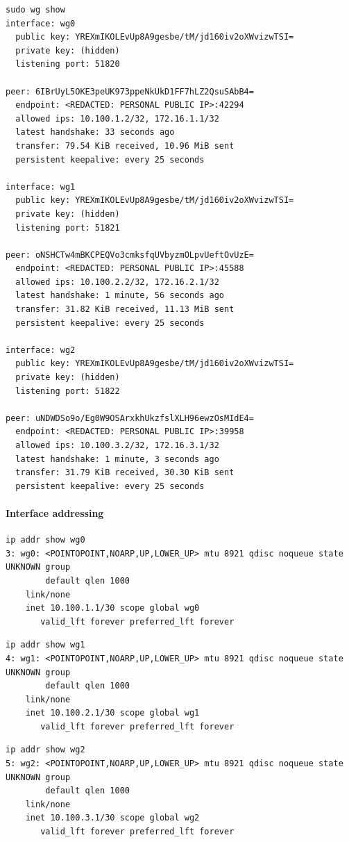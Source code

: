 \documentclass[11pt]{article}
\begin{document}
\begin{verbatim}
sudo wg show
interface: wg0
  public key: YREXmIKOLEvUp8A9gesbe/tM/jd160iv2oXWvizwTSI=
  private key: (hidden)
  listening port: 51820

peer: 6IBrUyL5OKE3peUK973ppeNkUkD1FF7hLZ2QsuSAbB4=
  endpoint: <REDACTED: PERSONAL PUBLIC IP>:42294
  allowed ips: 10.100.1.2/32, 172.16.1.1/32
  latest handshake: 33 seconds ago
  transfer: 79.54 KiB received, 10.96 MiB sent
  persistent keepalive: every 25 seconds

interface: wg1
  public key: YREXmIKOLEvUp8A9gesbe/tM/jd160iv2oXWvizwTSI=
  private key: (hidden)
  listening port: 51821

peer: oNSHCTw4mBKCPEQVo3cmksfqUVbyzmOLpvUeftOvUzE=
  endpoint: <REDACTED: PERSONAL PUBLIC IP>:45588
  allowed ips: 10.100.2.2/32, 172.16.2.1/32
  latest handshake: 1 minute, 56 seconds ago
  transfer: 31.82 KiB received, 11.13 MiB sent
  persistent keepalive: every 25 seconds

interface: wg2
  public key: YREXmIKOLEvUp8A9gesbe/tM/jd160iv2oXWvizwTSI=
  private key: (hidden)
  listening port: 51822

peer: uNDWDSo9o/Eg0W9OSArxkhUkzfslXLH96ewzOsMIdE4=
  endpoint: <REDACTED: PERSONAL PUBLIC IP>:39958
  allowed ips: 10.100.3.2/32, 172.16.3.1/32
  latest handshake: 1 minute, 3 seconds ago
  transfer: 31.79 KiB received, 30.30 KiB sent
  persistent keepalive: every 25 seconds
\end{verbatim}

\paragraph{Interface addressing}

\begin{verbatim}
ip addr show wg0
3: wg0: <POINTOPOINT,NOARP,UP,LOWER_UP> mtu 8921 qdisc noqueue state UNKNOWN group
        default qlen 1000
    link/none
    inet 10.100.1.1/30 scope global wg0
       valid_lft forever preferred_lft forever
\end{verbatim}

\begin{verbatim}
ip addr show wg1
4: wg1: <POINTOPOINT,NOARP,UP,LOWER_UP> mtu 8921 qdisc noqueue state UNKNOWN group
        default qlen 1000
    link/none
    inet 10.100.2.1/30 scope global wg1
       valid_lft forever preferred_lft forever
\end{verbatim}

\begin{verbatim}
ip addr show wg2
5: wg2: <POINTOPOINT,NOARP,UP,LOWER_UP> mtu 8921 qdisc noqueue state UNKNOWN group
        default qlen 1000
    link/none
    inet 10.100.3.1/30 scope global wg2
       valid_lft forever preferred_lft forever
\end{verbatim}
\end{document}
